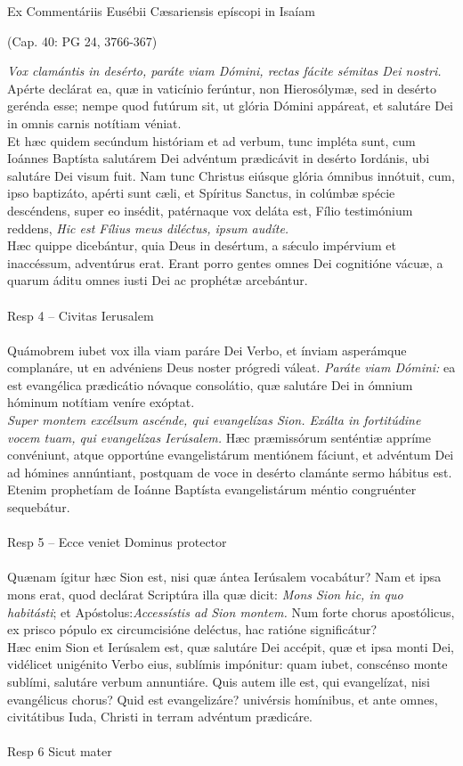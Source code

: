 \documentclass[options]{article}
\begin{document}
	Ex Commentáriis Eusébii Cæsariensis epíscopi in Isaíam
	\begin{flushright}
		(Cap. 40: PG 24, 3766-367)
	\end{flushright}
\emph{Vox clamántis in desérto, paráte viam Dómini, rectas fácite sémitas Dei nostri.}
Apérte declárat ea, quæ in vaticínio ferúntur, non Hierosólymæ, sed in desérto gerénda esse; nempe quod futúrum sit, ut glória Dómini appáreat, et salutáre Dei in omnis carnis notítiam véniat.\\
Et hæc quidem secúndum históriam et ad verbum, tunc impléta sunt, cum Ioánnes Baptísta salutárem Dei advéntum prædicávit in desérto Iordánis, ubi salutáre Dei visum fuit. Nam tunc Christus eiúsque glória ómnibus innótuit, cum, ipso baptizáto, apérti sunt cæli, et Spíritus Sanctus, in colúmbæ spécie descéndens, super eo insédit, patérnaque vox deláta est, Fílio testimónium reddens, \emph{Hic est Fílius meus diléctus, ipsum audíte.}\\
 Hæc quippe dicebántur, quia Deus in desértum, a s\'{æ}culo impérvium et inaccéssum, adventúrus erat. Erant porro gentes omnes Dei cognitióne vácuæ, a quarum áditu omnes iusti Dei ac prophétæ arcebántur.\\
 \\
 Resp 4 -- Civitas Ierusalem\\
 \\
 Quámobrem iubet vox illa viam paráre Dei Verbo, et ínviam asperámque complanáre, ut en advéniens Deus noster prógredi váleat. \emph{Paráte viam Dómini:} ea est evangélica prædicátio nóvaque consolátio, quæ salutáre Dei in ómnium hóminum notítiam veníre exóptat.\\
 \emph{Super montem excélsum ascénde, qui evangelízas Sion. Exálta in fortitúdine vocem tuam, qui evangelízas Ierúsalem.}
 Hæc præmissórum senténtiæ appríme convéniunt, atque opportúne evangelistárum mentiónem fáciunt, et advéntum Dei ad hómines annúntiant, postquam de voce in desérto clamánte sermo hábitus est. Etenim prophetíam de Ioánne Baptísta evangelistárum méntio congruénter sequebátur.\\
 \\
 Resp 5 -- Ecce veniet Dominus protector\\
 \\
 Quænam ígitur hæc Sion est, nisi quæ ántea Ierúsalem vocabátur? Nam et ipsa mons erat, quod declárat Scriptúra illa quæ dicit: \emph{Mons Sion hic, in quo habitásti}; et Apóstolus:\emph{Accessístis ad Sion montem.} Num forte chorus apostólicus, ex prisco pópulo ex circumcisióne deléctus, hac ratióne significátur?\\
 Hæc enim Sion et Ierúsalem est, quæ salutáre Dei accépit, quæ et ipsa monti Dei, vidélicet unigénito Verbo eius, sublímis impónitur: quam iubet, conscénso monte sublími, salutáre verbum annuntiáre. Quis autem ille est, qui evangelízat, nisi evangélicus chorus? Quid est evangelizáre? univérsis homínibus, et ante omnes, civitátibus Iuda, Christi in terram advéntum prædicáre.\\
 \\
 Resp 6 Sicut mater
\end{document}
